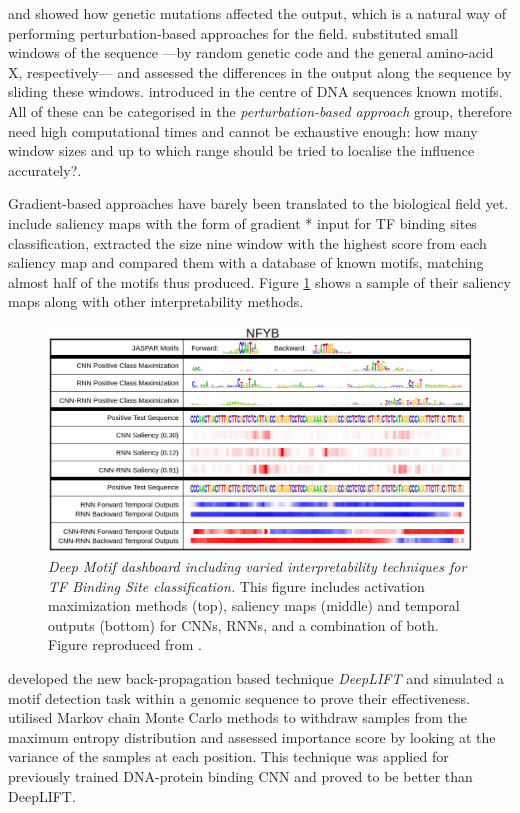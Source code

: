 \cite{Alipanahi2015} and \cite{Zhou2015} showed how genetic mutations affected the output, which is a natural way of performing perturbation-based approaches for the field. \cite{Umarov2017,Fontal2017} substituted small windows of the sequence ---by random genetic code and the general amino-acid X, respectively--- and assessed the differences in the output along the sequence by sliding these windows. \cite{Kelley2016} introduced in the centre of DNA sequences known motifs. All of these can be categorised in the \textit{perturbation-based approach} group, therefore need high computational times and cannot be exhaustive enough: how many window sizes and up to which range should be tried to localise the influence accurately?.

Gradient-based approaches have barely been translated to the biological field yet. \cite{Lanchantin2016} include saliency maps with the form of gradient * input for TF binding sites classification, extracted the size nine window with the highest score from each saliency map and compared them with a database of known motifs, matching almost half of the motifs thus produced. Figure \ref{fig:demo} shows a sample of their saliency maps along with other interpretability methods.

\begin{figure}
	\centering
	\includegraphics[width=0.8\linewidth]{Figures/demo}
	\caption{\textit{Deep Motif dashboard including varied interpretability techniques for TF Binding Site classification.} This figure includes activation maximization methods (top), saliency maps (middle) and temporal outputs (bottom) for CNNs, RNNs, and a combination of both. Figure reproduced from \cite{Lanchantin2016}.}
	\label{fig:demo}
\end{figure}

\cite{Shrikumar2017} developed the new back-propagation based technique \textit{DeepLIFT} and simulated a motif detection task within a genomic sequence to prove their effectiveness. \cite{Finnegan2017} utilised Markov chain Monte Carlo methods to withdraw samples from the maximum entropy distribution and assessed importance score by looking at the variance of the samples at each position. This technique was applied for previously trained DNA-protein binding CNN and proved to be better than DeepLIFT.

